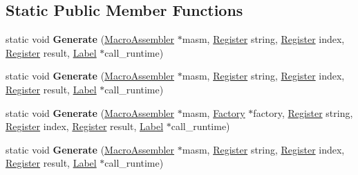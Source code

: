 \subsection*{Static Public Member Functions}
\begin{DoxyCompactItemize}
\item 
static void {\bfseries Generate} (\hyperlink{classv8_1_1internal_1_1_macro_assembler}{Macro\+Assembler} $\ast$masm, \hyperlink{structv8_1_1internal_1_1_register}{Register} string, \hyperlink{structv8_1_1internal_1_1_register}{Register} index, \hyperlink{structv8_1_1internal_1_1_register}{Register} result, \hyperlink{classv8_1_1internal_1_1_label}{Label} $\ast$call\+\_\+runtime)\hypertarget{classv8_1_1internal_1_1_string_char_load_generator_abb50098671ecd2dfb989a3e3ea38a72a}{}\label{classv8_1_1internal_1_1_string_char_load_generator_abb50098671ecd2dfb989a3e3ea38a72a}

\item 
static void {\bfseries Generate} (\hyperlink{classv8_1_1internal_1_1_macro_assembler}{Macro\+Assembler} $\ast$masm, \hyperlink{structv8_1_1internal_1_1_register}{Register} string, \hyperlink{structv8_1_1internal_1_1_register}{Register} index, \hyperlink{structv8_1_1internal_1_1_register}{Register} result, \hyperlink{classv8_1_1internal_1_1_label}{Label} $\ast$call\+\_\+runtime)\hypertarget{classv8_1_1internal_1_1_string_char_load_generator_abb50098671ecd2dfb989a3e3ea38a72a}{}\label{classv8_1_1internal_1_1_string_char_load_generator_abb50098671ecd2dfb989a3e3ea38a72a}

\item 
static void {\bfseries Generate} (\hyperlink{classv8_1_1internal_1_1_macro_assembler}{Macro\+Assembler} $\ast$masm, \hyperlink{classv8_1_1internal_1_1_factory}{Factory} $\ast$factory, \hyperlink{structv8_1_1internal_1_1_register}{Register} string, \hyperlink{structv8_1_1internal_1_1_register}{Register} index, \hyperlink{structv8_1_1internal_1_1_register}{Register} result, \hyperlink{classv8_1_1internal_1_1_label}{Label} $\ast$call\+\_\+runtime)\hypertarget{classv8_1_1internal_1_1_string_char_load_generator_a5a8fd405ba1de3b197fb46c682ecf6cc}{}\label{classv8_1_1internal_1_1_string_char_load_generator_a5a8fd405ba1de3b197fb46c682ecf6cc}

\item 
static void {\bfseries Generate} (\hyperlink{classv8_1_1internal_1_1_macro_assembler}{Macro\+Assembler} $\ast$masm, \hyperlink{structv8_1_1internal_1_1_register}{Register} string, \hyperlink{structv8_1_1internal_1_1_register}{Register} index, \hyperlink{structv8_1_1internal_1_1_register}{Register} result, \hyperlink{classv8_1_1internal_1_1_label}{Label} $\ast$call\+\_\+runtime)\hypertarget{classv8_1_1internal_1_1_string_char_load_generator_abb50098671ecd2dfb989a3e3ea38a72a}{}\label{classv8_1_1internal_1_1_string_char_load_generator_abb50098671ecd2dfb989a3e3ea38a72a}


\end{DoxyCompactItemize}
